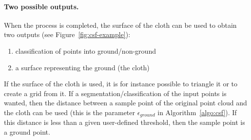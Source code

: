 \paragraph{Two possible outputs.}
When the process is completed, the surface of the cloth can be used to obtain two outputs (see Figure~\ref{fig:csf-example}):
\begin{enumerate}
  \item classification of points into ground/non-ground
  \item a surface representing the ground (the cloth)
\end{enumerate}
If the surface of the cloth is used, it is for instance possible to triangle it or to create a grid from it.
If a segmentation/classification of the input points is wanted, then the distance between a sample point of the original point cloud and the cloth can be used (this is the parameter $\epsilon_{ground}$ in Algorithm~\ref{algo:csf}).
If this distance is less than a given user-defined threshold, then the sample point is a ground point.
